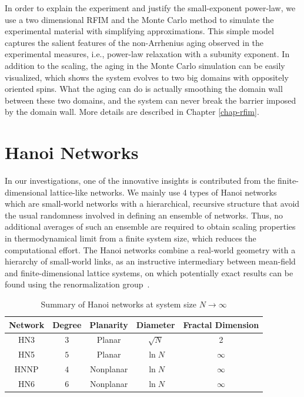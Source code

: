 In order to explain the experiment and justify the small-exponent power-law, we use a two dimensional RFIM and the Monte Carlo method to simulate the experimental material with simplifying approximations. This simple model captures the salient features of the non-Arrhenius aging observed in the experimental measures, i.e., power-law relaxation with a subunity exponent. In addition to the scaling, the aging in the Monte Carlo simulation can be easily visualized, which shows the system evolves to two big domains with oppositely oriented spins. What the aging can do is actually smoothing the domain wall between these two domains, and the system can never break the barrier imposed by the domain wall. More details are described in Chapter \ref{chap-rfim}.

\section{Hanoi Networks}
\label{sec:HN} 
In our investigations, one of the innovative insights is contributed from the finite-dimensional lattice-like networks. We mainly use 4 types of Hanoi networks ~\cite{Boettcher2008HN} which are small-world networks with a hierarchical, recursive structure that avoid the usual randomness involved in defining
an ensemble of networks. Thus, no additional averages of such an ensemble
are required to obtain scaling properties in thermodynamical limit
from a finite system size, which reduces the computational effort.
The Hanoi networks combine a real-world geometry with a hierarchy of small-world
links, as an instructive intermediary between mean-field and finite-dimensional
lattice systems, on which potentially exact results can be found using
the renormalization group~\cite{BoHa11}. 

\begin{table}
\begin{centering}
\protect\caption{\label{tab:hns} 
Summary of Hanoi networks at system size $N\rightarrow\infty$ }
\par\end{centering}
\begin{centering}
\par\end{centering}
\centering{}%
\begin{tabular}{|c|c|c|c|c|}
\hline 
Network & Degree  & Planarity & Diameter & Fractal Dimension  \tabularnewline
\hline 
\hline 
HN3  & $3$ & Planar & $\sqrt{N}$ & 2 \tabularnewline
\hline 
HN5  & $5$ & Planar &  $\ln N$ &  $\infty$  \tabularnewline
\hline 
HNNP  & $4$  & Nonplanar &  $\ln N$ & $\infty$   \tabularnewline
\hline 
HN6  & $6$  & Nonplanar &  $\ln N$  & $\infty$  \tabularnewline
\hline 
\end{tabular}
\end{table}

